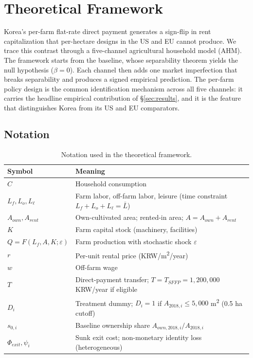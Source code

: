 \section{Theoretical Framework}
\label{sec:theory}

Korea's per-farm flat-rate direct payment generates a sign-flip in rent capitalization that per-hectare designs in the US and EU cannot produce. We trace this contrast through a five-channel agricultural household model (AHM). The framework starts from the \citet{SinghSquireStrauss1986_ahm} baseline, whose separability theorem yields the null hypothesis ($\beta = 0$). Each channel then adds one market imperfection that breaks separability and produces a signed empirical prediction. The per-farm policy design is the common identification mechanism across all five channels: it carries the headline empirical contribution of \S\ref{sec:results}, and it is the feature that distinguishes Korea from its US and EU comparators.

\subsection{Notation}
\label{sec:notation}

\begin{table}[h]
\centering
\caption{Notation used in the theoretical framework.}
\label{tab:notation}
\small
\begin{tabular}{ll}
\toprule
Symbol & Meaning \\
\midrule
$C$              & Household consumption \\
$L_f, L_o, L_\ell$ & Farm labor, off-farm labor, leisure (time constraint $L_f+L_o+L_\ell = \bar L$) \\
$A_{own}, A_{rent}$ & Own-cultivated area; rented-in area; $A = A_{own} + A_{rent}$ \\
$K$              & Farm capital stock (machinery, facilities) \\
$Q = F(L_f, A, K; \varepsilon)$ & Farm production with stochastic shock $\varepsilon$ \\
$r$              & Per-unit rental price (KRW/m\textsuperscript{2}/year) \\
$w$              & Off-farm wage \\
$T$              & Direct-payment transfer; $T = T_{SFFP} = 1{,}200{,}000$ KRW/year if eligible \\
$D_i$            & Treatment dummy; $D_i = 1$ if $A_{2018,i} \le 5{,}000$ m\textsuperscript{2} (0.5 ha cutoff) \\
$s_{0,i}$        & Baseline ownership share $A_{own,2018,i} / A_{2018,i}$ \\
$\Phi_{exit}, \psi_i$ & Sunk exit cost; non-monetary identity loss (heterogeneous) \\
\bottomrule
\end{tabular}
\end{table}


